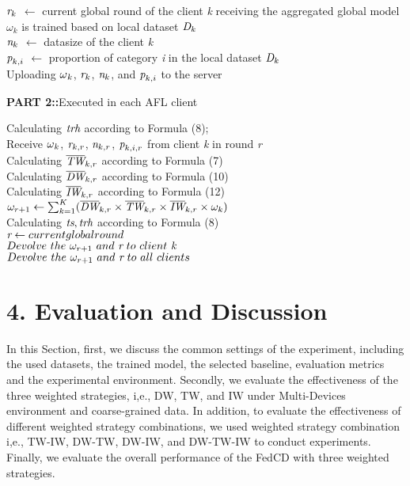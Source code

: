 \documentclass[twoside,twocolumn]{article}
\begin{document}
\begin{spacing}{1.0}
\begin{algorithm}
\begin{algorithmic}[1]
	\STATE $\emph{r}_{k}$ $\leftarrow$ current global round of the client \emph{k} receiving the aggregated global model\\
	\STATE $\omega_{k}$ is trained based on local dataset $\emph{D}_k$\\
	\STATE $\emph{n}_k$ $\leftarrow $ datasize of the client \emph{k}\\
	\STATE $\emph{p}_{k,i}$ $\leftarrow$ proportion of category \emph{i} in the local dataset $\emph{D}_k$\\
\ENDFOR
\STATE Uploading $\emph{$\omega$}_k$, $\emph{r}_k$, $\emph{n}_k$, and $\emph{p}_{k,i}$  to the server
\end{algorithmic} 
%
\textbf{PART 2::}Executed in each AFL client

\begin{algorithmic}[1]
\STATE Calculating $\emph{trh}$ according to Formula (8);\\
	\STATE Receive $\emph{$\omega$}_k$, $\emph{r}_{k,r}$, $\emph{n}_{k,r}$, $\emph{p}_{k,i,r}$  from client \emph{k} in round \emph{r}\\
	\STATE Calculating $\overline{\emph{TW}}_{k,r}$ according to Formula (7)\\
	\STATE Calculating $\overline{\emph{DW}}_{k,r}$ according to Formula (10)\\
	\STATE Calculating $\overline{\emph{IW}}_{k,r}$ according to Formula (12)\\
	\STATE $\omega_{r+1} \leftarrow \sum_{k=1}^{K}(\overline{\emph{DW}}_{k,r} \times \overline{\emph{TW}}_{k,r} \times \overline{\emph{IW}}_{k,r} \times \omega_{k})$\\
	\STATE Calculating $\emph{ts}, \emph{trh}$ according to Formula (8)\\
	\STATE $\emph{r} \leftarrow current global round$\\
		\STATE $Devolve\ the\ \omega_{r+1}\ and\ \emph{r}\ to\ client\ \emph{k}$\\
	\ELSE
		\STATE $Devolve\ the\ \omega_{r+1}\ and\ \emph{r}\ to\ all\ clients$
	\ENDIF
\ENDFOR
\end{algorithmic} 
\end{algorithm}
%
\section{4. Evaluation and Discussion}
In this Section, first, we discuss the common settings of the experiment, including the used datasets, the trained model, the selected baseline, evaluation metrics and the experimental environment. Secondly, we evaluate the effectiveness of the three weighted strategies, i,e., DW, TW, and IW under Multi-Devices environment and coarse-grained data. In addition, to evaluate the effectiveness of different weighted strategy combinations, we used weighted strategy combination i,e., TW-IW, DW-TW, DW-IW, and DW-TW-IW to conduct experiments. Finally, we evaluate the overall performance of the FedCD with three weighted strategies.

\end{spacing}
\end{document}
